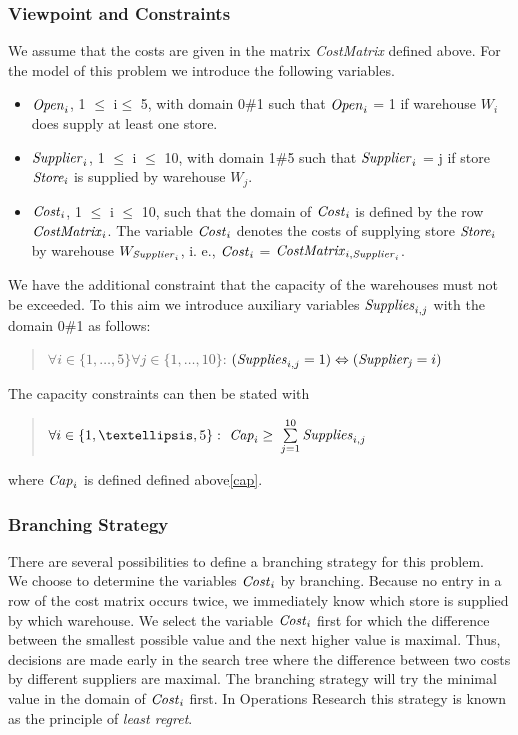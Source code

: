 \documentclass[a4paper]{scrartcl}
\begin{document}
\subsubsection{Viewpoint and Constraints}
We assume that the costs are given in the matrix {\it CostMatrix} 
defined above. For the model of this problem we introduce the 
following variables.
\begin{itemize}
\item
${\it Open}_i$, 1 $\leq$ i$ \leq$ 5, with domain 0$\#$1 such that 
${\it Open}_i$ = 1 if warehouse $W_i$ does supply at least one store.
\item
${\it Supplier}_i$, 1 $\leq$ i $\leq$ 10, with domain 1$\#$5 such that 
${\it Supplier}_i$ = j if store ${\it Store_i}$ is supplied by 
warehouse $W_j$.
\item
${\it Cost}_i$, 1 $\leq$ i $\leq$ 10, such that the domain of ${\it Cost}_i$ 
is defined by the row ${\it CostMatrix}_i$. The variable ${\it Cost}_i$ 
denotes the costs of supplying store ${\it Store}_i$ by warehouse 
$W_{{\it Supplier}_i}$, i. e., ${\it Cost}_i$ = ${\it CostMatrix}_{i,{\it Supplier}_i}$.
\end{itemize}
We have the additional constraint that the capacity of the warehouses 
must not be exceeded. To this aim we introduce auxiliary variables 
${\it Supplies}_{i,j}$ with the domain 0$\#$1 as follows:
\begin{quote}
$\forall i \in \{1,\ldots,5\} \forall j \in \{1,\ldots, 10\}$:
$({\it Supplies}_{i,j} = 1) \Leftrightarrow ({\it Supplier_j} = i)$
\end{quote}

The capacity constraints can then be stated with
\begin{quote}
$\forall i \in \{1, \ldots, 5\}:\ {\it Cap}_i \geq $
$\sum\limits_{j=1}^{10}{\it Supplies}_{i,j}$
\end{quote}
where ${\it Cap}_i$ is defined defined above\ref{cap}.


\subsubsection{Branching Strategy}
There are several possibilities to define a branching 
strategy for this problem.\\

We choose to determine the variables ${\it Cost}_i$ by branching. 
Because no entry in a row of the cost matrix occurs twice, we 
immediately know which store is supplied by which warehouse. 
We select the variable ${\it Cost}_i$ first for which the difference 
between the smallest possible value and the next higher value 
is maximal. Thus, decisions are made early in the search tree 
where the difference between two costs by different suppliers 
are maximal. The branching strategy will try the minimal 
value in the domain of ${\it Cost}_i$ first. In Operations 
Research this strategy is known as the principle of {\it least regret}.
\end{document}
